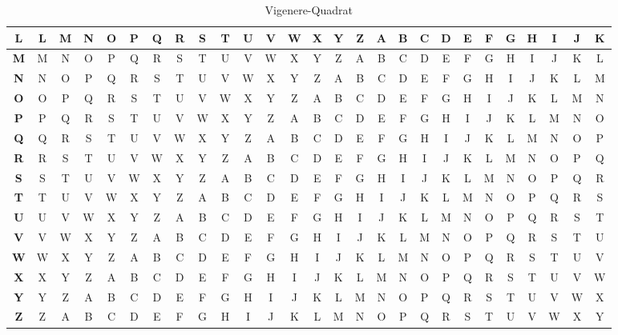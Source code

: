 \documentclass[a4paper, 11pt, accentcolor = tud3b]{tudreport}
\begin{document}
\begin{table}[H]
\begin{tabular}{|c||c|c|c|c|c|c|c|c|c|c|c|c|c|c|c|c|c|c|c|c|c|c|c|c|c|c|}
\textbf{L} & L & M & N & O & P & Q & R & S & T & U & V & W & X & Y & Z & A & B & C & D & E & F & G & H & I & J & K \\ \hline
\textbf{M} & M & N & O & P & Q & R & S & T & U & V & W & X & Y & Z & A & B & C & D & E & F & G & H & I & J & K & L \\ \hline
\textbf{N} & N & O & P & Q & R & S & T & U & V & W & X & Y & Z & A & B & C & D & E & F & G & H & I & J & K & L & M \\ \hline
\textbf{O} & O & P & Q & R & S & T & U & V & W & X & Y & Z & A & B & C & D & E & F & G & H & I & J & K & L & M & N \\ \hline
\textbf{P} & P & Q & R & S & T & U & V & W & X & Y & Z & A & B & C & D & E & F & G & H & I & J & K & L & M & N & O \\ \hline
\textbf{Q} & Q & R & S & T & U & V & W & X & Y & Z & A & B & C & D & E & F & G & H & I & J & K & L & M & N & O & P \\ \hline
\textbf{R} & R & S & T & U & V & W & X & Y & Z & A & B & C & D & E & F & G & H & I & J & K & L & M & N & O & P & Q \\ \hline
\textbf{S} & S & T & U & V & W & X & Y & Z & A & B & C & D & E & F & G & H & I & J & K & L & M & N & O & P & Q & R \\ \hline
\textbf{T} & T & U & V & W & X & Y & Z & A & B & C & D & E & F & G & H & I & J & K & L & M & N & O & P & Q & R & S \\ \hline
\textbf{U} & U & V & W & X & Y & Z & A & B & C & D & E & F & G & H & I & J & K & L & M & N & O & P & Q & R & S & T \\ \hline
\textbf{V} & V & W & X & Y & Z & A & B & C & D & E & F & G & H & I & J & K & L & M & N & O & P & Q & R & S & T & U \\ \hline
\textbf{W} & W & X & Y & Z & A & B & C & D & E & F & G & H & I & J & K & L & M & N & O & P & Q & R & S & T & U & V \\ \hline
\textbf{X} & X & Y & Z & A & B & C & D & E & F & G & H & I & J & K & L & M & N & O & P & Q & R & S & T & U & V & W \\ \hline
\textbf{Y} & Y & Z & A & B & C & D & E & F & G & H & I & J & K & L & M & N & O & P & Q & R & S & T & U & V & W & X \\ \hline
\textbf{Z} & Z & A & B & C & D & E & F & G & H & I & J & K & L & M & N & O & P & Q & R & S & T & U & V & W & X & Y \\ \hline
	                    	\end{tabular}
	                    	\caption{Vigenere-Quadrat}
	                    \end{table}
                    
\end{document}
